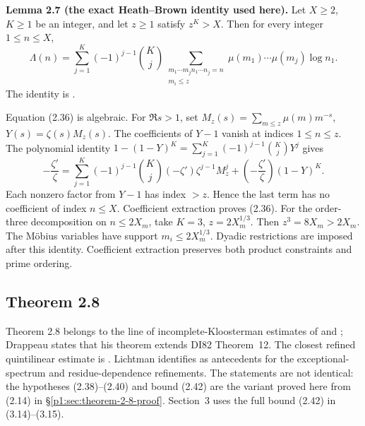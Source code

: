 \textbf{Lemma 2.7 (the exact Heath--Brown identity used here).} Let $X\geq2$, $K\geq1$ be an integer, and let $z\geq1$ satisfy $z^K>X$. Then for every integer $1\leq n\leq X$,
\[
 \Lambda(n)=\sum_{j=1}^{K}(-1)^{j-1}\binom Kj
 \sum_{\substack{m_1\cdots m_jn_1\cdots n_j=n\\m_i\leq z}}
 \mu(m_1)\cdots\mu(m_j)\log n_1.
\tag{2.36}\label{p1:eq:2.36}
\]
The identity is \cite[Lemma~1, (6)]{HB82}.

Equation (2.36) is algebraic. For $\Re s>1$, set $M_z(s)=\sum_{m\leq z}\mu(m)m^{-s}$, $Y(s)=\zeta(s)M_z(s)$. The coefficients of $Y-1$ vanish at indices $1\leq n\leq z$. The polynomial identity $1-(1-Y)^K=\sum_{j=1}^K(-1)^{j-1}\binom KjY^j$ gives
\[
 -\frac{\zeta'}\zeta
 =\sum_{j=1}^K(-1)^{j-1}\binom Kj
       (-\zeta')\zeta^{j-1}M_z^j
   +\left(-\frac{\zeta'}\zeta\right)(1-Y)^K.
\tag{2.37}\label{p1:eq:2.37}
\]
Each nonzero factor from $Y-1$ has index $>z$. Hence the last term has no coefficient of index $n\leq X$. Coefficient extraction proves (2.36). For the order-three decomposition on $n\leq2X_m$, take $K=3$, $z=2X_m^{1/3}$. Then $z^3=8X_m>2X_m$. The Möbius variables have support $m_i\leq2X_m^{1/3}$. Dyadic restrictions are imposed after this identity. Coefficient extraction preserves both product constraints and prime ordering.

\subsection{Theorem 2.8}

Theorem 2.8 belongs to the line of incomplete-Kloosterman estimates of
\cite[Theorem~12]{DI82} and
\cite[Theorem~2.1]{Drappeau}; Drappeau states that his theorem extends
DI82 Theorem~12. The closest refined quintilinear estimate is
\cite[Theorem~1.8, (1.8)--(1.9)]{Lichtman23}. Lichtman identifies
\cite{DPR23,ABL21} as antecedents for the exceptional-spectrum and
residue-dependence refinements. The statements are not identical: the
hypotheses (2.38)--(2.40) and bound (2.42) are the variant proved here
from (2.14) in \S\ref{p1:sec:theorem-2-8-proof}. Section~3 uses the full
bound (2.42) in (3.14)--(3.15).

